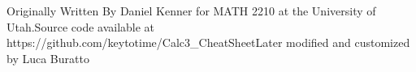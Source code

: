 \documentclass[10pt,landscape]{article}
\makeatletter
\renewcommand{\subsection}{\@startsection{subsection}{2}{0mm}%
                                {-1explus -.5ex minus -.2ex}%
                                {0.5ex plus .2ex}%
                                {\normalfont\normalsize\bfseries}}
\makeatother
\begin{document}
\begin{multicols*}{5}
\begin{comment}
\subsection{Stokes Theorem}
Let:\newline
$\cdot$S be a 3D surface\newline
$\cdot\vec{F}(x,y,z) = M(x,y,z)\hat{i}+N(x,y,z)\hat{j}+P(x,y,z)\hat{l} $\newline
$\cdot$M,N,P have continuous $1^{st}$ order partial derivatives\newline
$\cdot$C is piece-wise smooth, simple, closed, curve, positively oriented\newline
$\cdot\hat{T}$ is unit tangent vector to C.\newline
Then,\newline
$ \oint\vec{F}_c\cdot\hat{T}dS = \int\int_s (\nabla\times\vec{F})\cdot\hat{n} dS = \int\int_R(\nabla\times\vec{F})\cdot\vec{n}dxdy $\newline
Remember:\newline
$ \oint\vec{F}\cdot\vec{T}ds = \int_c (Mdx + Ndy + Pdz) $
\end{comment}

\vfill
{\fontsize{.5}{1}\selectfont Originally Written By Daniel Kenner for MATH 2210 at the University of Utah.\newline Source code available at https://github.com/keytotime/Calc3\_CheatSheet\newline Later modified and customized by Luca Buratto} 
\end{multicols*}
\end{document}
